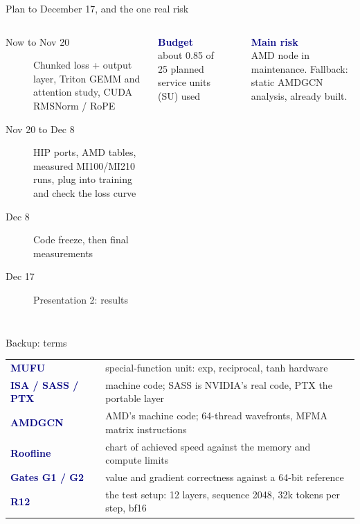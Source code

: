 \documentclass[aspectratio=169,11pt]{beamer}
\newcommand{\key}[1]{\textcolor{navy}{\textbf{#1}}}
\begin{document}
\begin{frame}{Plan to December 17, and the one real risk}
\begin{columns}[T]
\small
\begin{description}
\item[Now to Nov 20] Chunked loss + output layer, Triton GEMM and attention study, CUDA RMSNorm / RoPE
\item[Nov 20 to Dec 8] HIP ports, AMD tables, measured MI100/MI210 runs, plug into training and check the loss curve
\item[Dec 8] Code freeze, then final measurements
\item[Dec 17] Presentation 2: results
\end{description}
\colorbox{pale}{\parbox{0.95\linewidth}{\small\key{Budget}\\ about 0.85 of 25 planned service units (SU) used}}\\[6pt]
\colorbox{pale}{\parbox{0.95\linewidth}{\small\key{Main risk}\\ AMD node in maintenance. Fallback: static AMDGCN analysis, already built.}}
\end{columns}
\end{frame}

\appendix
\begin{frame}{Backup: terms}
\small\renewcommand{\arraystretch}{1.4}
\begin{tabular}{@{}p{3.2cm}p{9cm}@{}}
\key{MUFU} & special-function unit: exp, reciprocal, tanh hardware\\
\key{ISA / SASS / PTX} & machine code; SASS is NVIDIA's real code, PTX the portable layer\\
\key{AMDGCN} & AMD's machine code; 64-thread wavefronts, MFMA matrix instructions\\
\key{Roofline} & chart of achieved speed against the memory and compute limits\\
\key{Gates G1 / G2} & value and gradient correctness against a 64-bit reference\\
\key{R12} & the test setup: 12 layers, sequence 2048, 32k tokens per step, bf16\\
\end{tabular}
\end{frame}
\end{document}
